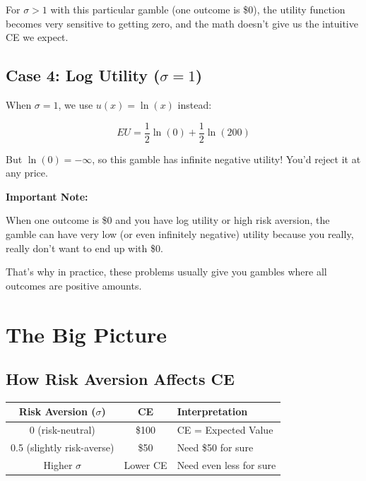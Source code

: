 \documentclass[12pt]{article}
\begin{document}
For $\sigma > 1$ with this particular gamble (one outcome is \$0), the utility function becomes very sensitive to getting zero, and the math doesn't give us the intuitive CE we expect.

\subsection*{Case 4: Log Utility ($\sigma = 1$)}

When $\sigma = 1$, we use $u(x) = \ln(x)$ instead:

\[
EU = \frac{1}{2} \ln(0) + \frac{1}{2} \ln(200)
\]

But $\ln(0) = -\infty$, so this gamble has infinite negative utility! You'd reject it at any price.

\begin{tcolorbox}[colback=red!5!white,colframe=red!75!black]
\textbf{Important Note:}

When one outcome is \$0 and you have log utility or high risk aversion, the gamble can have very low (or even infinitely negative) utility because you really, really don't want to end up with \$0.

That's why in practice, these problems usually give you gambles where all outcomes are positive amounts.
\end{tcolorbox}

\newpage

\section*{The Big Picture}

\subsection*{How Risk Aversion Affects CE}

\begin{center}
\begin{tabular}{|c|c|l|}
\hline
\textbf{Risk Aversion ($\sigma$)} & \textbf{CE} & \textbf{Interpretation} \\
\hline
0 (risk-neutral) & \$100 & CE = Expected Value \\
\hline
0.5 (slightly risk-averse) & \$50 & Need \$50 for sure \\
\hline
Higher $\sigma$ & Lower CE & Need even less for sure \\
\hline
\end{tabular}
\end{center}
\end{document}

